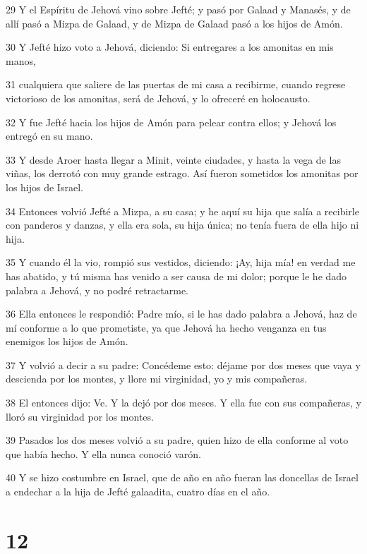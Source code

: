 \par 29 Y el Espíritu de Jehová vino sobre Jefté; y pasó por Galaad y Manasés, y de allí pasó a Mizpa de Galaad, y de Mizpa de Galaad pasó a los hijos de Amón.
\par 30 Y Jefté hizo voto a Jehová, diciendo: Si entregares a los amonitas en mis manos,
\par 31 cualquiera que saliere de las puertas de mi casa a recibirme, cuando regrese victorioso de los amonitas, será de Jehová, y lo ofreceré en holocausto.
\par 32 Y fue Jefté hacia los hijos de Amón para pelear contra ellos; y Jehová los entregó en su mano.
\par 33 Y desde Aroer hasta llegar a Minit, veinte ciudades, y hasta la vega de las viñas, los derrotó con muy grande estrago. Así fueron sometidos los amonitas por los hijos de Israel.
\par 34 Entonces volvió Jefté a Mizpa, a su casa; y he aquí su hija que salía a recibirle con panderos y danzas, y ella era sola, su hija única; no tenía fuera de ella hijo ni hija.
\par 35 Y cuando él la vio, rompió sus vestidos, diciendo: ¡Ay, hija mía! en verdad me has abatido, y tú misma has venido a ser causa de mi dolor; porque le he dado palabra a Jehová, y no podré retractarme. 
\par 36 Ella entonces le respondió: Padre mío, si le has dado palabra a Jehová, haz de mí conforme a lo que prometiste, ya que Jehová ha hecho venganza en tus enemigos los hijos de Amón.
\par 37 Y volvió a decir a su padre: Concédeme esto: déjame por dos meses que vaya y descienda por los montes, y llore mi virginidad, yo y mis compañeras.
\par 38 El entonces dijo: Ve. Y la dejó por dos meses. Y ella fue con sus compañeras, y lloró su virginidad por los montes.
\par 39 Pasados los dos meses volvió a su padre, quien hizo de ella conforme al voto que había hecho. Y ella nunca conoció varón.
\par 40 Y se hizo costumbre en Israel, que de año en año fueran las doncellas de Israel a endechar a la hija de Jefté galaadita, cuatro días en el año.

\chapter{12}

